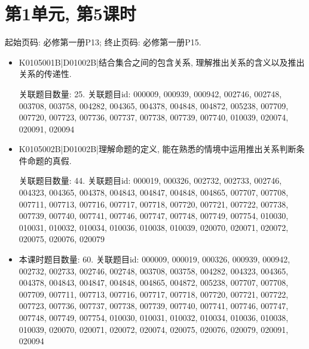 \section*{第1单元, 第5课时}
起始页码: 必修第一册P13; 终止页码: 必修第一册P15.
\begin{itemize}
\item K0105001B|D01002B|结合集合之间的包含关系, 理解推出关系的含义以及推出关系的传递性.

关联题目数量: 25. 关联题目id: 000009, 000939, 000942, 002746, 002748, 003708, 003758, 004282, 004365, 004378, 004848, 004872, 005238, 007709, 007720, 007723, 007736, 007737, 007738, 007739, 007740, 010039, 020074, 020091, 020094

\item K0105002B|D01002B|理解命题的定义, 能在熟悉的情境中运用推出关系判断条件命题的真假.

关联题目数量: 44. 关联题目id: 000019, 000326, 002732, 002733, 002746, 004323, 004365, 004378, 004843, 004847, 004848, 004865, 007707, 007708, 007711, 007713, 007716, 007717, 007718, 007720, 007721, 007722, 007738, 007739, 007740, 007741, 007746, 007747, 007748, 007749, 007754, 010030, 010031, 010032, 010034, 010036, 010038, 010039, 020070, 020071, 020072, 020075, 020076, 020079

\item 本课时题目数量: 60. 关联题目id: 000009, 000019, 000326, 000939, 000942, 002732, 002733, 002746, 002748, 003708, 003758, 004282, 004323, 004365, 004378, 004843, 004847, 004848, 004865, 004872, 005238, 007707, 007708, 007709, 007711, 007713, 007716, 007717, 007718, 007720, 007721, 007722, 007723, 007736, 007737, 007738, 007739, 007740, 007741, 007746, 007747, 007748, 007749, 007754, 010030, 010031, 010032, 010034, 010036, 010038, 010039, 020070, 020071, 020072, 020074, 020075, 020076, 020079, 020091, 020094

\end{itemize}

